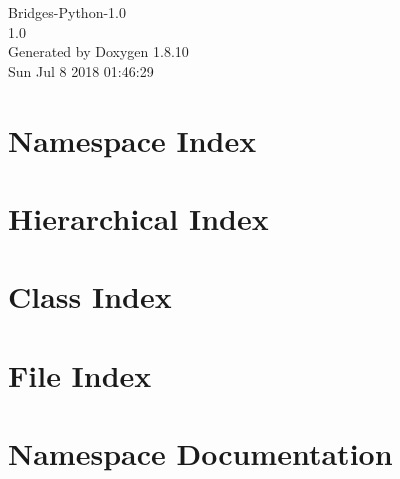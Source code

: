 \documentclass[twoside]{book}
\newcommand{\+}{\discretionary{\mbox{\scriptsize$\hookleftarrow$}}{}{}}
\newcommand{\clearemptydoublepage}{%
  \newpage{\pagestyle{empty}\cleardoublepage}%
}
\begin{document}
\hypersetup{pageanchor=false,
             bookmarks=true,
             bookmarksnumbered=true,
             pdfencoding=unicode
            }
\begin{titlepage}
\vspace*{7cm}
\begin{center}%
{\Large Bridges-\/\+Python-\/1.0 \\[1ex]\large 1.\+0 }\\
\vspace*{1cm}
{\large Generated by Doxygen 1.8.10}\\
\vspace*{0.5cm}
{\small Sun Jul 8 2018 01:46:29}\\
\end{center}
\end{titlepage}
\clearemptydoublepage
\tableofcontents
\clearemptydoublepage
{}
\hypersetup{pageanchor=true}

\chapter{Namespace Index}

\chapter{Hierarchical Index}

\chapter{Class Index}

\chapter{File Index}

\chapter{Namespace Documentation}






























\end{document}
